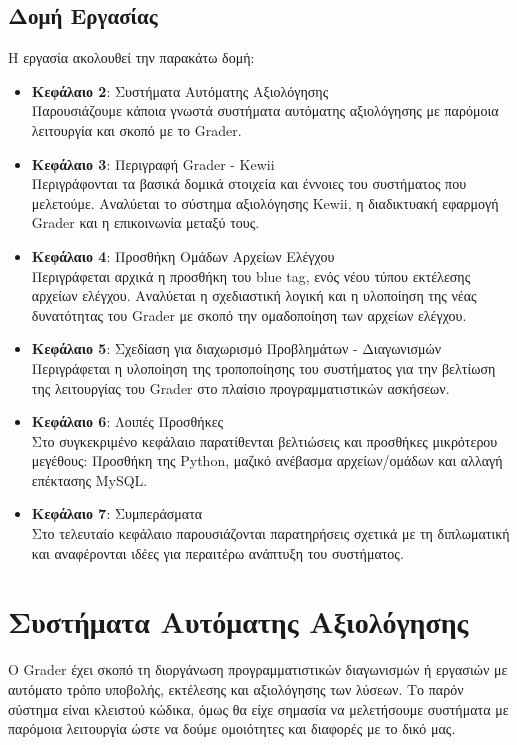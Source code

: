 \documentclass[diploma]{softlab-thesis}
\begin{document}
\newpage

\section{Δομή Εργασίας}

Η εργασία ακολουθεί την παρακάτω δομή:

\begin{itemize}
  \item \textbf{Κεφάλαιο 2}: Συστήματα Αυτόματης Αξιολόγησης \\
    Παρουσιάζουμε κάποια γνωστά συστήματα αυτόματης αξιολόγησης με παρόμοια
    λειτουργία και σκοπό με το Grader.
  \item \textbf{Κεφάλαιο 3}: Περιγραφή Grader - Kewii \\
    Περιγράφονται τα βασικά δομικά στοιχεία και έννοιες του συστήματος που
    μελετούμε. Αναλύεται το σύστημα αξιολόγησης Kewii, η διαδικτυακή
    εφαρμογή Grader και η επικοινωνία μεταξύ τους.
  \item \textbf{Κεφάλαιο 4}: Προσθήκη Ομάδων Αρχείων Ελέγχου \\
    Περιγράφεται αρχικά η προσθήκη του blue tag, ενός νέου τύπου εκτέλεσης
    αρχείων ελέγχου. Αναλύεται η σχεδιαστική λογική και η υλοποίηση της νέας
    δυνατότητας του Grader με σκοπό την ομαδοποίηση των αρχείων ελέγχου.
  \item \textbf{Κεφάλαιο 5}: Σχεδίαση για διαχωρισμό Προβλημάτων - Διαγωνισμών \\
    Περιγράφεται η υλοποίηση της τροποποίησης του συστήματος για την βελτίωση
    της λειτουργίας του Grader στο πλαίσιο προγραμματιστικών ασκήσεων.
  \item \textbf{Κεφάλαιο 6}: Λοιπές Προσθήκες \\
    Στο συγκεκριμένο κεφάλαιο παρατίθενται βελτιώσεις και προσθήκες μικρότερου
    μεγέθους: Προσθήκη της Python, μαζικό ανέβασμα αρχείων/ομάδων και αλλαγή
    επέκτασης MySQL.
  \item \textbf{Κεφάλαιο 7}: Συμπεράσματα \\
    Στο τελευταίο κεφάλαιο παρουσιάζονται παρατηρήσεις σχετικά με τη
    διπλωματική και αναφέρονται ιδέες για περαιτέρω ανάπτυξη του συστήματος.
\end{itemize}


\chapter{Συστήματα Αυτόματης Αξιολόγησης}

O Grader έχει σκοπό τη διοργάνωση προγραμματιστικών διαγωνισμών ή εργασιών
με αυτόματο τρόπο υποβολής, εκτέλεσης και αξιολόγησης των λύσεων. Το παρόν
σύστημα είναι κλειστού κώδικα, όμως θα είχε σημασία να μελετήσουμε συστήματα
με παρόμοια λειτουργία ώστε να δούμε ομοιότητες και διαφορές με το δικό μας.
\end{document}
